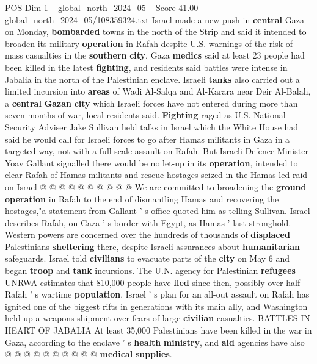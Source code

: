 \begin{textsample}{POS Dim 1 – global\_north\_2024\_05 – Score 41.00 – global\_north\_2024\_05/108359324.txt}  \label{ex:f1_pos_279}
Israel made a new push in \textbf{central} Gaza on Monday, \textbf{bombarded} towns in the north of the Strip and said it intended to broaden its military \textbf{operation} in Rafah despite U.S. warnings of the risk of mass casualties in the \textbf{southern} \textbf{city}.
Gaza \textbf{medics} said at least 23 people had been killed in the latest \textbf{fighting}, and residents said battles were intense in Jabalia in the north of the Palestinian enclave.
Israeli \textbf{tanks} also carried out a limited incursion into \textbf{areas} of Wadi Al-Salqa and Al-Karara near Deir Al-Balah, a \textbf{central} \textbf{Gazan} \textbf{city} which Israeli forces have not entered during more than seven months of war, local residents said. \textbf{Fighting} raged as U.S.
National Security Adviser Jake Sullivan held talks in Israel which the White House had said he would call for Israeli forces to go after Hamas militants in Gaza in a targeted way, not with a full-scale assault on Rafah.
But Israeli Defence Minister Yoav Gallant signalled there would be no let-up in its \textbf{operation}, intended to clear Rafah of Hamas militants and rescue hostages seized in the Hamas-led raid on Israel @ @ @ @ @ @ @ @ @ @ We are committed to broadening the \textbf{ground} \textbf{operation} in Rafah to the end of dismantling Hamas and recovering the hostages,"a statement from Gallant ' s office quoted him as telling Sullivan.
Israel describes Rafah, on Gaza ' s border with Egypt, as Hamas ' last stronghold.
Western powers are concerned over the hundreds of thousands of \textbf{displaced} Palestinians \textbf{sheltering} there, despite Israeli assurances about \textbf{humanitarian} safeguards.
Israel told \textbf{civilians} to evacuate parts of the \textbf{city} on May 6 and began \textbf{troop} and \textbf{tank} incursions.
The U.N. agency for Palestinian \textbf{refugees} UNRWA estimates that 810,000 people have \textbf{fled} since then, possibly over half Rafah ' s wartime \textbf{population}.
Israel ' s plan for an all-out assault on Rafah has ignited one of the biggest rifts in generations with its main ally, and Washington held up a weapons shipment over fears of large \textbf{civilian} casualties.
BATTLES IN HEART OF JABALIA At least 35,000 Palestinians have been killed in the war in Gaza, according to the enclave ' s \textbf{health} \textbf{ministry}, and \textbf{aid} agencies have also @ @ @ @ @ @ @ @ @ @ \textbf{medical} \textbf{supplies}.

\end{textsample}
